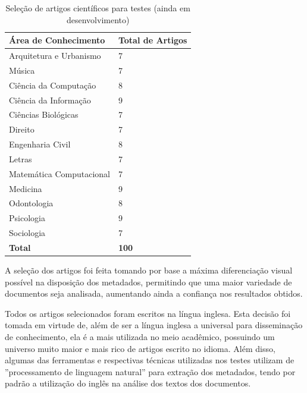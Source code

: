 \begin{table}
    \caption{Seleção de artigos científicos para testes (ainda em desenvolvimento)}
    \begin{center}
        \begin{tabular}{|l|l|}
            \hline
            \textbf{Área de Conhecimento} & \textbf{Total de Artigos} \\ 
            \hline
            Arquitetura e Urbanismo & 7 \\ 
            Música & 7 \\ 
            Ciência da Computação & 8 \\
            Ciência da Informação & 9 \\
            Ciências Biológicas & 7 \\
            Direito & 7 \\
            Engenharia Civil & 8 \\
            Letras & 7 \\
            Matemática Computacional & 7 \\
            Medicina & 9 \\ 
            Odontologia & 8 \\ 
            Psicologia & 9 \\
            Sociologia & 7 \\   
            \hline
            \textbf{Total} & \textbf{100} \\
            \hline 
        \end{tabular}
    \end{center}
    \label{tab:papers-list}
\end{table}

A seleção dos artigos foi feita tomando por base a máxima diferenciação visual possível na disposição dos metadados, permitindo que uma maior variedade de documentos seja analisada, aumentando ainda a confiança nos resultados obtidos.


Todos os artigos selecionados foram escritos na língua inglesa. Esta decisão foi tomada em virtude de, além de ser a língua inglesa a universal para disseminação de conhecimento, ela é a mais utilizada no meio acadêmico, possuindo um universo muito maior e mais rico de artigos escrito no idioma. Além disso, algumas das ferramentas e respectivas técnicas utilizadas nos testes utilizam de ''processamento de linguagem natural'' para extração dos metadados, tendo por padrão a utilização do inglês na análise dos textos dos documentos.

